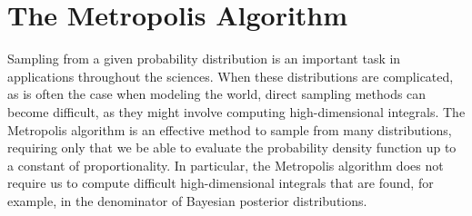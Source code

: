 
\section*{The Metropolis Algorithm}
Sampling from a given probability distribution is an important task in applications throughout the sciences.
When these distributions are complicated, as is often the case when modeling the world, direct sampling methods 
can become difficult, as they might involve computing high-dimensional integrals. 
The Metropolis algorithm is an effective method to sample from many distributions, requiring only that we 
be able to evaluate the probability density function up to a constant of proportionality. In particular,
the Metropolis algorithm does not require us to compute difficult high-dimensional integrals that are found,
for example, in the denominator of Bayesian posterior distributions. 

